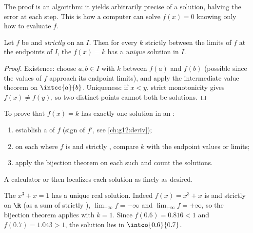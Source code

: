 \begin{remark}
The  proof is an algorithm: it yields arbitrarily precise
 of a solution, halving the error at each step. This is how a
computer can solve $f(x) = 0$ knowing only how to evaluate $f$.
\end{remark}

\begin{theorem}\label{thm:g12:limcont:bijection}
Let $f$ be  and \emph{strictly } on an  $I$. Then
for every $k$ strictly between the limits of $f$ at the endpoints of $I$, the
 $f(x) = k$ has a \emph{unique} solution in $I$.
\end{theorem}

\begin{proof}
Existence: choose $a, b \in I$ with $k$ between $f(a)$ and $f(b)$ (possible
since the values of $f$ approach its endpoint limits), and apply the
intermediate value theorem on $\intcc{a}{b}$. Uniqueness: if $x < y$, strict
monotonicity gives $f(x) \neq f(y)$, so two distinct points cannot both be
solutions.
\end{proof}

\begin{method}[Solving $f(x) = k$ with the bijection theorem]\label{met:g12:limcont:bijection}
To prove that $f(x) = k$ has exactly one solution in an :
\begin{enumerate}
  \item establish a  of $f$ (sign of $f'$, see
        \cref{ch:g12:deriv});
  \item on each  where $f$ is  and strictly ,
        compare $k$ with the endpoint values or limits;
  \item apply the bijection theorem on each such  and count the
        solutions.
\end{enumerate}
A calculator or  then localizes each solution as finely as desired.
\end{method}

\begin{example}\label{ex:g12:limcont:cubic}
The  $x^3 + x = 1$ has a unique real solution. Indeed
$f(x) = x^3 + x$ is  and strictly  on $\R$ (as a sum of
strictly ), $\lim_{-\infty} f = -\infty$ and
$\lim_{+\infty} f = +\infty$, so the bijection theorem applies with $k = 1$.
Since $f(0.6) = 0.816 < 1$ and $f(0.7) = 1.043 > 1$, the solution lies in
$\intoo{0.6}{0.7}$.
\end{example}

